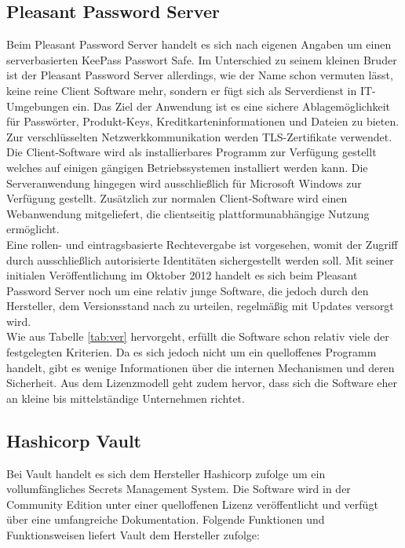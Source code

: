\documentclass[
book,
a4paper,   
titlepage,  
halfparskip,
12pt        
]{scrartcl}
\begin{document}
\begin{onehalfspacing}
\subsection{Pleasant Password Server}
Beim Pleasant Password Server handelt es sich nach eigenen Angaben um einen serverbasierten KeePass Passwort Safe\cite{pleasant}. Im Unterschied zu seinem kleinen Bruder ist der Pleasant Password Server allerdings, wie der Name schon vermuten lässt, keine reine Client Software mehr, sondern er fügt sich als Serverdienst in \ac{IT}-Umgebungen ein. Das Ziel der Anwendung ist es eine sichere Ablagemöglichkeit für Passwörter, Produkt-Keys, Kreditkarteninformationen und Dateien zu bieten. Zur verschlüsselten Netzwerkkommunikation werden \ac{TLS}-Zertifikate verwendet. Die Client-Software wird als installierbares Programm zur Verfügung gestellt welches auf einigen gängigen Betriebssystemen installiert werden kann. Die Serveranwendung hingegen wird ausschließlich für Microsoft Windows zur Verfügung gestellt. Zusätzlich zur normalen Client-Software wird einen Webanwendung mitgeliefert, die clientseitig plattformunabhängige Nutzung ermöglicht.\cite{pleasant}\\
Eine rollen- und eintragsbasierte Rechtevergabe ist vorgesehen, womit der Zugriff durch ausschließlich autorisierte Identitäten sichergestellt werden soll. Mit seiner initialen Veröffentlichung im Oktober 2012 handelt es sich beim Pleasant Password Server noch um eine relativ junge Software, die jedoch durch den Hersteller, dem Versionsstand nach zu urteilen, regelmäßig mit Updates versorgt wird.\cite{pleasant}\\
Wie aus Tabelle \vref{tab:ver} hervorgeht, erfüllt die Software schon relativ viele der festgelegten Kriterien. Da es sich jedoch nicht um ein quelloffenes Programm handelt, gibt es wenige Informationen über die internen Mechanismen und deren Sicherheit. Aus dem Lizenzmodell geht zudem hervor, dass sich die Software eher an kleine bis mittelständige Unternehmen richtet.

\subsection{Hashicorp Vault}
\label{subsubsec:vault}
Bei Vault handelt es sich dem Hersteller Hashicorp zufolge um ein vollumfängliches Secrets Management System. Die Software wird in der Community Edition unter einer quelloffenen Lizenz veröffentlicht und verfügt über eine umfangreiche Dokumentation. Folgende Funktionen und Funktionsweisen liefert Vault dem Hersteller zufolge:\cite{vaultintro}


\end{onehalfspacing}
\end{document}
